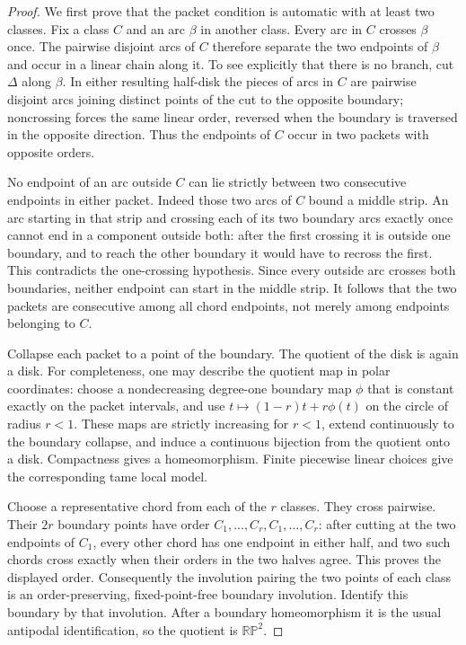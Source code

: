 \begin{proof}
We first prove that the packet condition is automatic with at least
two classes.  Fix a class $C$ and an arc $\beta$ in another class.
Every arc in $C$ crosses $\beta$ once.  The pairwise disjoint arcs of
$C$ therefore separate the two endpoints of $\beta$ and occur in a
linear chain along it.  To see explicitly that there is no branch,
cut $\Delta$ along $\beta$.  In either resulting half-disk the pieces
of arcs in $C$ are pairwise disjoint arcs joining distinct points of
the cut to the opposite boundary; noncrossing forces the same linear
order, reversed when the boundary is traversed in the opposite
direction.  Thus the endpoints of $C$ occur in two packets with
opposite orders.

No endpoint of an arc outside $C$ can lie strictly between two
consecutive endpoints in either packet.  Indeed those two arcs of
$C$ bound a middle strip.  An arc starting in that strip and crossing
each of its two boundary arcs exactly once cannot end in a component
outside both: after the first crossing it is outside one boundary,
and to reach the other boundary it would have to recross the first.
This contradicts the one-crossing hypothesis.  Since every outside
arc crosses both boundaries, neither endpoint can start in the
middle strip.  It follows that the two packets are consecutive among
all chord endpoints, not merely among endpoints belonging to $C$.

Collapse each packet to a point of the boundary.  The quotient of the
disk is again a disk.  For completeness, one may describe the quotient
map in polar coordinates: choose a nondecreasing degree-one boundary
map $\phi$ that is constant exactly on the packet intervals, and use
$t\mapsto (1-r)t+r\phi(t)$ on the circle of radius $r<1$.  These maps
are strictly increasing for $r<1$, extend continuously to the boundary
collapse, and induce a continuous bijection from the quotient onto a
disk.  Compactness gives a homeomorphism.  Finite piecewise linear
choices give the corresponding tame local model.

Choose a representative chord from each of the $r$ classes.  They
cross pairwise.  Their $2r$ boundary points have order
$C_1,\ldots,C_r,C_1,\ldots,C_r$: after cutting at the two endpoints
of $C_1$, every other chord has one endpoint in either half, and two
such chords cross exactly when their orders in the two halves agree.
This proves the displayed order.  Consequently the involution pairing
the two points of each class is an order-preserving, fixed-point-free
boundary involution.  Identify this boundary by that involution.
After a boundary homeomorphism it is the usual antipodal
identification, so the quotient is $\mathbb {RP}^2$.


\end{proof}
